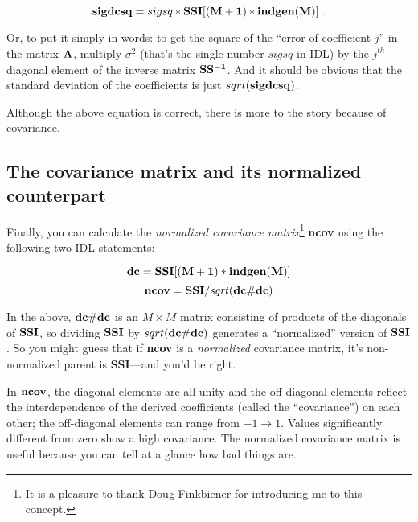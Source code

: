 \begin{equation}
\label{lscoefferror}
{\bf sigdcsq} = sigsq * {\bf SSI[(M+1)*indgen(M)]} \; .
\end{equation}

\noindent Or, to put it simply in words: to get the square of the
``error of coefficient $j$'' in the matrix ${\bf A}$, multiply
$\sigma^2$ (that's the single number $sigsq$ in IDL) by the $j^{th}$
diagonal element of the inverse matrix ${\bf
SS^{-1}}$. And it should be obvious that the standard
deviation of the coefficients is just $sqrt({\bf sigdcsq})$. 

	Although the above equation is correct, there is more to the
story because of covariance. 

\subsection{The covariance matrix and its normalized counterpart}

\label{ncov}

	Finally, you can calculate the {\it normalized covariance
matrix}\footnote{It is a pleasure to thank Doug Finkbiener for
introducing me to this concept.} {\bf ncov} using the following two IDL
statements:
 
\begin{mathletters}
\begin{equation}
{\bf dc = SSI[(M+1)*indgen(M)]}
\end{equation}
\begin{equation}
{\bf ncov = SSI/{\it sqrt}(dc \# dc)}
\end{equation}
\end{mathletters}

\noindent In the above, ${\bf dc \# dc}$ is an $M \times M$ matrix
consisting of products of the diagonals of ${\bf SSI}$, so dividing
${\bf SSI}$ by $sqrt({\bf dc \# dc})$ generates a ``normalized'' version
of ${\bf SSI}$.  So you might guess that if {\bf ncov} is a {\it
normalized} covariance matrix, it's non-normalized parent is {\bf
SSI}---and you'd be right.  

	In ${\bf ncov}$, the diagonal elements are all unity and the
off-diagonal elements reflect the interdependence of the derived
coefficients (called the ``covariance'') on each other; the off-diagonal
elements can range from $-1 \rightarrow 1$.  Values significantly
different from zero show a high covariance.  The normalized covariance
matrix is useful because you can tell at a glance how bad things are. 

